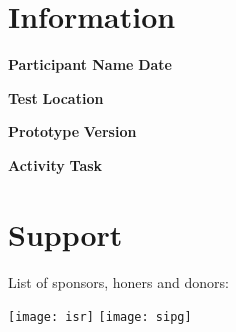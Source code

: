 
\section*{Information}

\vspace{1cm}

\textbf{Participant Name} \hfill \textbf{Date}

\vspace{2.5cm}

\textbf{Test} \hfill \textbf{Location}

\vspace{2.5cm}

\textbf{Prototype} \hfill \textbf{Version}

\vspace{2.5cm}

\textbf{Activity} \hfill \textbf{Task}

\vfill


\section*{Support}

\hfill

List of sponsors, honers and donors:

\hfill


\hfill

\texttt{[image: isr]} \hfill \texttt{[image: sipg]} \hfill

\hfill

